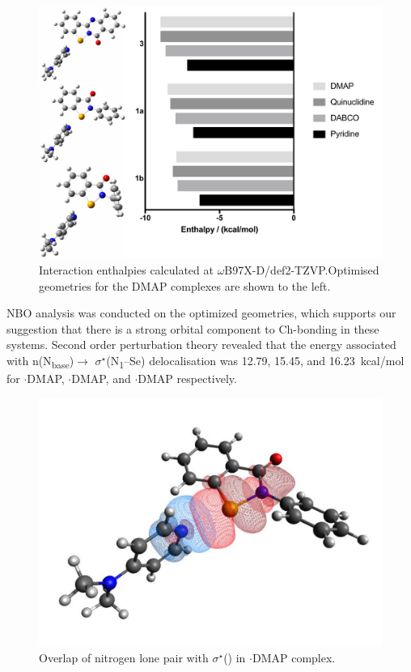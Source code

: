\begin{refsection}
    \begin{figure}
      \centering
      \includegraphics[width=0.8\linewidth]{Figures/dft-energies.pdf}
      \caption[Interaction energies for various complexes.]{Interaction enthalpies calculated at $ \omega $B97X-D/def2-TZVP.\@ Optimised geometries for the DMAP complexes are shown to the left.}
    \end{figure}
    
    NBO analysis was conducted on the optimized geometries, which supports our suggestion that there is a strong orbital component to Ch-bonding in these systems.
    Second order perturbation theory revealed that the energy associated with n(N\textsubscript{base})$ \rightarrow $ $ \sigma^{\star} $(N\textsubscript{1}--Se) delocalisation was 12.79, 15.45, and 16.23~kcal/mol for $ \cdot $DMAP, $ \cdot $DMAP, and $ \cdot $DMAP respectively.
    
    \begin{figure}
      \centering
      \includegraphics[width=0.6\linewidth]{Figures/phenyl-dmap-overlap.pdf}
      \caption[Orbital overlap for $ \cdot $DMAP.]{Overlap of nitrogen lone pair with $ \sigma^{\star} $() in $ \cdot $DMAP complex.}\label{fig:phenyl-dmap-overlap}
    \end{figure}
    

\end{refsection}
